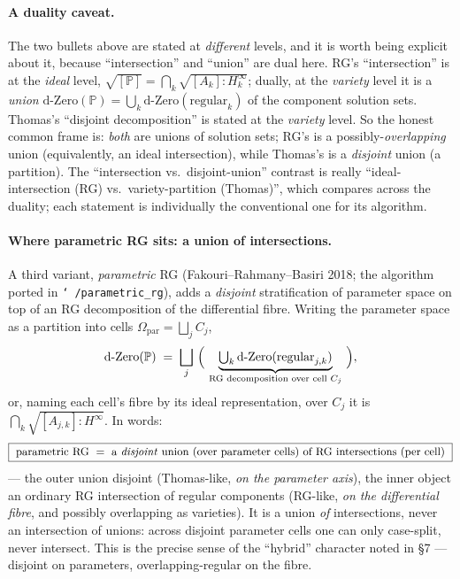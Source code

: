 \documentclass[11pt]{article}
\newcommand{\code}[1]{\texttt{#1}}
\newcommand{\dZero}{\mathrm{d\text{-}Zero}}
\newcommand{\PP}{\mathbb{P}}
\begin{document}
\paragraph{A duality caveat.} The two bullets above are stated at
\emph{different} levels, and it is worth being explicit about it, because
``intersection'' and ``union'' are dual here. RG's ``intersection'' is at the
\emph{ideal} level, $\sqrt{[\PP]}=\bigcap_k\sqrt{[A_k]\!:\!H_k^\infty}$; dually,
at the \emph{variety} level it is a \emph{union}
$\dZero(\PP)=\bigcup_k\dZero(\text{regular}_k)$ of the component solution sets.
Thomas's ``disjoint decomposition'' is stated at the \emph{variety} level. So
the honest common frame is: \emph{both} are unions of solution sets; RG's is a
possibly-\emph{overlapping} union (equivalently, an ideal intersection), while
Thomas's is a \emph{disjoint} union (a partition). The ``intersection vs.\
disjoint-union'' contrast is really ``ideal-intersection (RG) vs.\
variety-partition (Thomas)'', which compares across the duality; each statement
is individually the conventional one for its algorithm.

\paragraph{Where parametric RG sits: a union of intersections.} A third variant,
\emph{parametric} RG (Fakouri--Rahmany--Basiri 2018; the algorithm ported in
\code{\char`~/parametric\_rg}), adds a \emph{disjoint} stratification of parameter
space on top of an RG decomposition of the differential fibre. Writing the
parameter space as a partition into cells $\Omega_{\text{par}}=\bigsqcup_j C_j$,
\[
  \dZero(\PP)\;=\;\bigsqcup_{j}\ \Bigl(\ \underbrace{\textstyle\bigcup_k
      \dZero(\text{regular}_{j,k})}_{\text{RG decomposition over cell }C_j}\ \Bigr),
\]
or, naming each cell's fibre by its ideal representation, over $C_j$ it is
$\bigcap_k\sqrt{[A_{j,k}]\!:\!H^\infty}$. In words:
\[
  \boxed{\ \text{parametric RG}\ =\ \text{a \emph{disjoint} union (over parameter
      cells) of RG intersections (per cell)}\ }
\]
--- the outer union disjoint (Thomas-like, \emph{on the parameter axis}), the
inner object an ordinary RG intersection of regular components (RG-like,
\emph{on the differential fibre}, and possibly overlapping as varieties). It is
a union \emph{of} intersections, never an intersection of unions: across
disjoint parameter cells one can only case-split, never intersect. This is the
precise sense of the ``hybrid'' character noted in \S7 --- disjoint on
parameters, overlapping-regular on the fibre.
\end{document}
